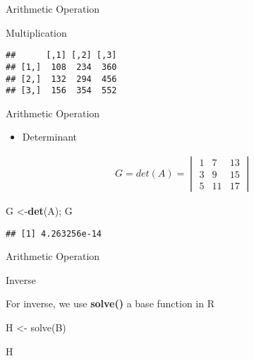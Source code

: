 \documentclass[ignorenonframetext,]{beamer}
\newenvironment{Shaded}{\begin{snugshade}}{\end{snugshade}}
\newcommand{\KeywordTok}[1]{\textcolor[rgb]{0.13,0.29,0.53}{\textbf{#1}}}
\newcommand{\StringTok}[1]{\textcolor[rgb]{0.31,0.60,0.02}{#1}}
\newcommand{\OperatorTok}[1]{\textcolor[rgb]{0.81,0.36,0.00}{\textbf{#1}}}
\newcommand{\NormalTok}[1]{#1}
\providecommand{\tightlist}{%
  \setlength{\itemsep}{0pt}\setlength{\parskip}{0pt}}
\begin{document}
\begin{frame}[fragile]{Arithmetic Operation}

\begin{block}{Multiplication}

\begin{Shaded}
\end{Shaded}

\begin{verbatim}
##      [,1] [,2] [,3]
## [1,]  108  234  360
## [2,]  132  294  456
## [3,]  156  354  552
\end{verbatim}

\end{block}

\end{frame}

\begin{frame}[fragile]{Arithmetic Operation}

\begin{itemize}
\tightlist
\item
  Determinant
\end{itemize}

\begin{align*}
G=det(A)=\begin{vmatrix}
1&7&13\\
3&9&15\\
5&11&17
\end{vmatrix}\end{align*}

\begin{Shaded}
\begin{Highlighting}[]
\NormalTok{G <-}\KeywordTok{det}\NormalTok{(A); G}
\end{Highlighting}
\end{Shaded}

\begin{verbatim}
## [1] 4.263256e-14
\end{verbatim}

\end{frame}

\begin{frame}{Arithmetic Operation}

\begin{block}{Inverse}

For inverse, we use \textbf{solve()} a base function in R

H \textless{}- solve(B)

H

\end{block}

\end{frame}
\end{document}
